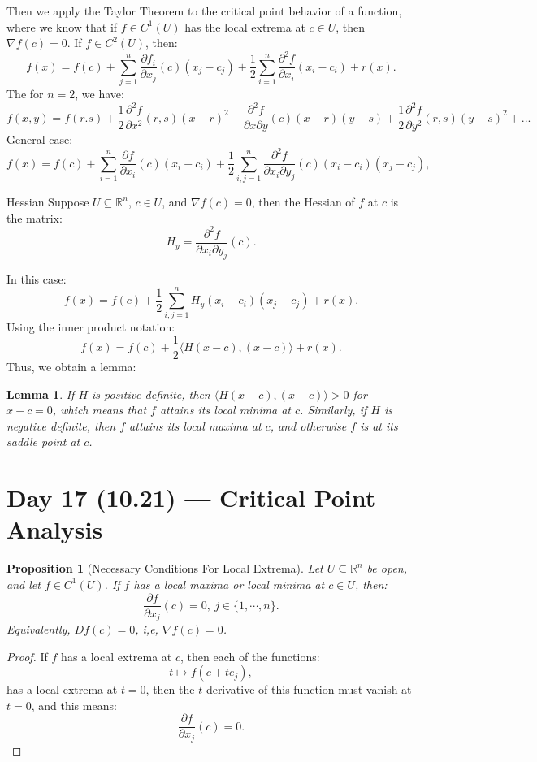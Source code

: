 \documentclass[11pt]{article}
\makeatletter
\newcounter{thmcounter}
\newenvironment{definition}[1]{\begin{defbox}{#1}{}}{\end{defbox}}
\theoremstyle{quiet}
\newtheorem{proposition}[thmcounter]{Proposition}
\newtheorem{lemma}[thmcounter]{Lemma}
\newtheorem{proposition}[tcb@cnt@defbox]{Proposition}
\newtheorem{lemma}[tcb@cnt@defbox]{Lemma}
\theoremstyle{quietremark}
\makeatother
\begin{document}
Then we apply the Taylor Theorem to the critical point behavior of a function, where we know that if $f\in C^1(U)$ has the local extrema at $c\in U$, then $\nabla f(c)=0$. If $f\in C^2(U)$, then:
\[
f(x)=f(c)+\sum_{j=1}^n \frac{\partial f_i}{\partial x_j}(c)(x_j-c_j)+\frac{1}{2}\sum_{i=1}^n \frac{\partial^2 f}{\partial x_i}(x_i-c_i)+r(x).
\]
The for $n=2$, we have:
\[
f(x,y)=f(r.s)+\frac{1}{2}\frac{\partial^2 f}{\partial x^2}(r,s)(x-r)^2+\frac{\partial^2 f}{\partial x\partial y}(c)(x-r)(y-s)+\frac{1}{2}\frac{\partial^2 f}{\partial y^2}(r,s)(y-s)^2+...
\]
General case:
\[
f(x)=f(c)+\sum_{i=1}^n\frac{\partial f}{\partial x_i}(c)(x_i-c_i)+\frac{1}{2}\sum_{i,j=1}^n\frac{\partial^2 f}{\partial x_i\partial y_j}(c)(x_i-c_i)(x_j-c_j),
\]
\begin{definition}{Hessian}
Suppose $U\subseteq\mathbb{R}^n$, $c\in U$, and $\nabla f(c)=0$, then the Hessian of $f$ at $c$ is the matrix:
\[
H_y=\frac{\partial^2 f}{\partial x_i\partial y_j}(c).
\]
\end{definition}

In this case:
\[
f(x)=f(c)+
\frac{1}{2}\sum_{i,j=1}^nH_y(x_i-c_i)(x_j-c_j)+r(x).
\]
Using the inner product notation:
\[
f(x)=f(c)+\frac{1}{2}\langle H(x-c),(x-c)\rangle+r(x).
\]
Thus, we obtain a lemma:
\begin{lemma}{}
If $H$ is positive definite, then $\langle  H(x-c),(x-c)\rangle>0$ for $x-c=0$, which means that $f$ attains its local minima at $c$. Similarly, if $H$ is negative definite, then $f$ attains its local maxima at $c$, and otherwise $f$ is at its saddle point at $c$.
\end{lemma}

\newpage
\section{Day 17 (10.21) --- Critical Point Analysis}
\begin{proposition}[Necessary Conditions For Local Extrema]
Let $U\subseteq\mathbb{R}^n$ be open, and let $f\in C^1(U)$. If $f$ has a local maxima or local minima at $c\in U$, then:
\[
\frac{\partial f}{\partial x_j}(c)=0,~j\in\{1,\cdots,n\}.
\]
Equivalently, $Df(c)=0$, i,e, $\nabla f(c)=0$.
\end{proposition}

\begin{proof}
If $f$ has a local extrema at $c$, then each of the functions:
\[
t\mapsto f(c+te_j),
\]
has a local extrema at $t=0$, then the $t$-derivative of this function must vanish at $t=0$, and this means:
\[
\frac{\partial f}{\partial x_j}(c)=0.
\]
\end{proof}
\end{document}

